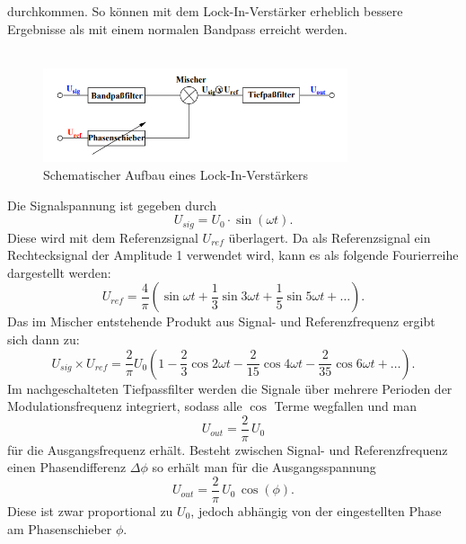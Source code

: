 durchkommen. So können mit dem Lock-In-Verstärker erheblich bessere Ergebnisse als mit einem normalen Bandpass erreicht werden.\\
\\
\begin{figure}[H]
    \centering
    \includegraphics[width=0.8\textwidth]{img/abb1.png}
    \caption{Schematischer Aufbau eines Lock-In-Verstärkers\protect\footnotemark}
    \label{fig:abb1}
\end{figure}
Die Signalspannung ist gegeben durch
\begin{equation}
    U_{sig} = U_0 \cdot \sin(\omega t).
\end{equation}
Diese wird mit dem Referenzsignal $U_{ref}$ überlagert. Da als Referenzsignal ein Rechtecksignal der Amplitude 1 verwendet wird, kann es als folgende Fourierreihe
dargestellt werden:
\begin{equation}\label{eqn:referenzFrequenz}
    U_{ref} = \frac{4}{\pi}\left(\sin{ωt} + \frac{1}{3}\sin{3ωt} + \frac{1}{5}\sin{5ωt} + \ldots\right).
\end{equation}
Das im Mischer entstehende Produkt aus Signal- und Referenzfrequenz ergibt sich dann zu:
\begin{equation}\label{eqn:produkt}
    U_{sig} \times U_{ref} = \frac{2}{π}U_0\left( 1 - \frac{2}{3}\cos{2ωt} - \frac{2}{15}\cos{4ωt} - \frac{2}{35}\cos{6ωt} + \ldots\right).
\end{equation}
Im nachgeschalteten Tiefpassfilter werden die Signale über mehrere Perioden der Modulationsfrequenz integriert, sodass alle $\cos$ Terme wegfallen und man
\begin{equation}\label{eqn:U0}
    U_{out} = \frac{2}{\pi}\,U_0
\end{equation}
für die Ausgangsfrequenz erhält. Besteht zwischen Signal- und Referenzfrequenz einen Phasendifferenz $\Delta \phi$ so erhält man für die Ausgangsspannung
\begin{equation}\label{U0phi}
    U_{out} = \frac{2}{\pi}\,U_0\,\cos(\phi).
\end{equation}
Diese ist zwar proportional zu $U_0$, jedoch abhängig von der eingestellten Phase am Phasenschieber $\phi$.